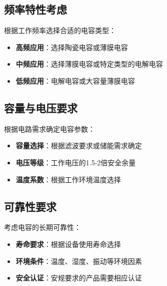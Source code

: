 \documentclass[12pt,UTF8]{ctexbook}
\begin{document}
\subsection{频率特性考虑}

根据工作频率选择合适的电容类型：
\begin{itemize}[leftmargin=3.5em]
    \item \textbf{高频应用}：选择陶瓷电容或薄膜电容
    \item \textbf{中频应用}：选择薄膜电容或特定类型的电解电容
    \item \textbf{低频应用}：电解电容或大容量薄膜电容
\end{itemize}

\subsection{容量与电压要求}

根据电路需求确定电容参数：
\begin{itemize}[leftmargin=3.5em]
    \item \textbf{容量选择}：根据滤波要求或储能需求确定
    \item \textbf{电压等级}：工作电压的1.5-2倍安全余量
    \item \textbf{温度系数}：根据工作环境温度选择
\end{itemize}

\subsection{可靠性要求}

考虑电容的长期可靠性：
\begin{itemize}[leftmargin=3.5em]
    \item \textbf{寿命要求}：根据设备使用寿命选择
    \item \textbf{环境条件}：温度、湿度、振动等环境因素
    \item \textbf{安全认证}：安规要求的产品需要相应认证
\end{itemize}
\end{document}
